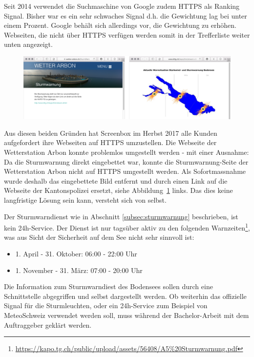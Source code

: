 Seit 2014 verwendet die Suchmaschine von Google zudem HTTPS als Ranking Signal. Bisher war es ein sehr schwaches Signal d.h. die Gewichtung lag bei unter einem Prozent. Google behält sich allerdings vor, die Gewichtung zu erhöhen\cite{Googleblog:https-as-ranking-signal}. Webseiten, die nicht über HTTPS verfügen werden somit in der Trefferliste weiter unten angezeigt.

\begin{figure}[h!]
	\centering
	\includegraphics[width=1\linewidth]{img/sturm}
	\caption{}
	\label{img:sturm}
\end{figure}

Aus diesen beiden Gründen hat Screenbox im Herbst 2017 alle Kunden aufgefordert ihre Webseiten auf HTTPS umzustellen. Die Webseite der Wetterstation Arbon konnte problemlos umgestellt werden - mit einer Ausnahme: Da die Sturmwarnung direkt eingebettet war, konnte die Sturmwarnung-Seite der Wetterstation Arbon nicht auf HTTPS umgestellt werden. Als Sofortmassnahme wurde deshalb das eingebettete Bild entfernt und durch einen Link auf die Webseite der Kantonspolizei ersetzt, siehe Abbildung~\ref{img:sturm} links. Das dies keine langfristige Lösung sein kann, versteht sich von selbst.

Der Sturmwarndienst wie in Abschnitt \ref{subsec:sturmwarnung} beschrieben, ist kein 24h-Service. Der Dienst ist nur tagsüber aktiv zu den folgenden Warnzeiten\footnote{ \url{https://kapo.tg.ch/public/upload/assets/56408/A5\%20Sturmwarnung.pdf}}, was aus Sicht der Sicherheit auf dem See nicht sehr sinnvoll ist:

\begin{itemize}  
\item 1. April - 31. Oktober: 06:00 - 22:00 Uhr 
\item 1. November - 31. März: 07:00 - 20:00 Uhr
\end{itemize}

\noindent
Die Information zum Sturmwarndiest des Bodensees sollen durch eine Schnittstelle abgegriffen und selbst dargestellt werden. Ob weiterhin das offizielle Signal für die Sturmleuchten, oder ein 24h-Service zum Beispiel von MeteoSchweiz verwendet werden soll, muss während der Bachelor-Arbeit mit dem Auftraggeber geklärt werden.



